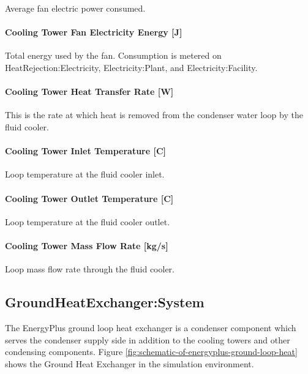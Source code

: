 Average fan electric power consumed.

\paragraph{Cooling Tower Fan Electricity Energy {[}J{]}}\label{cooling-tower-fan-electric-energy-j-7}

Total energy used by the fan. Consumption is metered on HeatRejection:Electricity, Electricity:Plant, and Electricity:Facility.

\paragraph{Cooling Tower Heat Transfer Rate {[}W{]}}\label{cooling-tower-heat-transfer-rate-w-7}

This is the rate at which heat is removed from the condenser water loop by the fluid cooler.

\paragraph{Cooling Tower Inlet Temperature {[}C{]}}\label{cooling-tower-inlet-temperature-c-7}

Loop temperature at the fluid cooler inlet.

\paragraph{Cooling Tower Outlet Temperature {[}C{]}}\label{cooling-tower-outlet-temperature-c-7}

Loop temperature at the fluid cooler outlet.

\paragraph{Cooling Tower Mass Flow Rate {[}kg/s{]}}\label{cooling-tower-mass-flow-rate-kgs-7}

Loop mass flow rate through the fluid cooler.

\subsection{GroundHeatExchanger:System}\label{groundheatexchangersystem}

The EnergyPlus ground loop heat exchanger is a condenser component which serves the condenser supply side in addition to the cooling towers and other condensing components. Figure \ref{fig:schematic-of-energyplus-ground-loop-heat} shows the Ground Heat Exchanger in the simulation environment.

